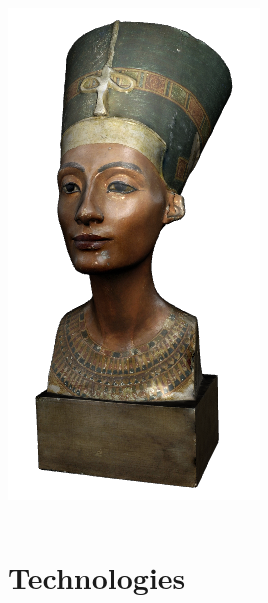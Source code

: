 \begin{frame}
\begin{columns}
\begin{column}{0.2\textwidth}
      \includegraphics[width=.9\textwidth]{images/nefertiti}
    \end{column}
  \end{columns}
\end{frame}

\section{Technologies}

